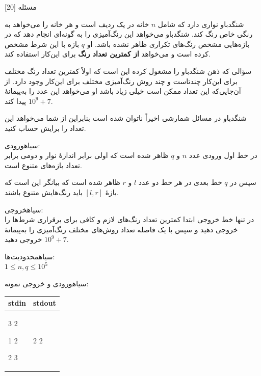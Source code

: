 
‌مسئله [20]

شنگدباو نواری دارد که شامل $n$ خانه در یک ردیف است و هر خانه را می‌خواهد به رنگی خاص رنگ کند. شنگدباو می‌خواهد این رنگ‌آمیزی را به گونه‌ای انجام دهد که در بازه‌هایی مشخص رنگ‌های تکراری ظاهر نشده باشد. او $q$ بازه با این شرط مشخص کرده است و می‌خواهد \textbf{از کمترین تعداد رنگ} برای این‌کار استفاده کند.

سؤالی که ذهن شنگدباو را مشغول کرده این است که اولاً کمترین تعداد رنگ مختلف برای این‌کار چند‌تاست و چند روش رنگ‌آمیزی مختلف برای این‌کار وجود دارد. از آن‌جایی‌که این تعداد ممکن است خیلی زیاد باشد او می‌خواهد این عدد را به‌پیمانۀ $10^9 + 7$ پیدا کند. 

شنگدباو در مسائل شمارشی اخیراً ناتوان شده است بنابراین از شما می‌خواهد این تعداد را برایش حساب کنید.

‌سیاه{ورودی:}\\
در خط اول ورودی عدد $n$ و $q$ ظاهر شده است که اولی برابر اندازۀ نوار و دومی برابر تعداد بازه‌های متنوع است.

سپس در $q$ خط بعدی در هر خط دو عدد $l$ و $r$ ظاهر شده است که بیانگر این است که بازۀ $[l, r]$ باید رنگ‌هایش متنوع باشند.

‌سیاه{خروجی:}\\
در تنها خط خروجی ابتدا کمترین تعداد رنگ‌های لازم و کافی برای برقراری شرط‌ها را خروجی دهید و سپس با یک فاصله تعداد روش‌های مختلف رنگ‌آمیزی را به‌پیمانۀ $10^9 + 7$ خروجی دهید.


‌سیاه{محدودیت‌ها:}\\
$1\leq n, q\leq 10^5$


‌سیاه{ورودی و خروجی نمونه:}\\


\begin{latin}
\begin{tabularx}{\textwidth}{|X | X|}
\hline
\textbf{stdin} &
\textbf{stdout}\\
\hline
3 2

1 2

2 3&
2 2\\
\hline

\end{tabularx}
\end{latin}


